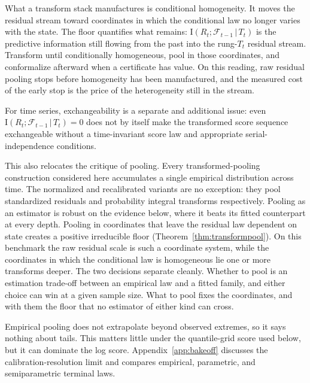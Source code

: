\documentclass[11pt]{article}
\theoremstyle{remark}
\newcommand{\I}{\mathrm{I}}
\newcommand{\given}{\,|\,}
\newcommand{\F}{\mathcal{F}}
\begin{document}
What a transform stack manufactures is conditional homogeneity. It moves the residual stream
toward coordinates in which the conditional law no longer varies with the state. The floor
quantifies what remains: $\I(R_t;\F_{t-1}\given T_t)$ is the predictive information still
flowing from the past into the rung-$T_t$ residual stream. Transform until conditionally homogeneous, pool
in those coordinates, and conformalize afterward when a certificate has value. On this
reading, raw residual pooling stops before homogeneity has been manufactured,
and the measured cost of the early stop is the price of the heterogeneity still in the stream.

For time series, exchangeability is a separate and additional issue: even
$\I(R_t;\F_{t-1}\given T_t)=0$ does not by itself make the transformed score sequence
exchangeable without a time-invariant score law and appropriate serial-independence
conditions.

This also relocates the critique of pooling. Every transformed-pooling construction considered here accumulates a single empirical
distribution across time. The normalized and recalibrated variants are no exception: they
pool standardized residuals and probability integral transforms respectively.
Pooling as an estimator is robust on the evidence below, where it beats its fitted
counterpart at every depth. Pooling in coordinates that leave the residual law dependent on state creates a positive
irreducible floor (Theorem~\ref{thm:transformpool}). On this benchmark the raw residual
scale is such a coordinate system, while the coordinates in which the conditional law is homogeneous lie one
or more transforms deeper. The two decisions separate cleanly. Whether to pool is an estimation
trade-off between an empirical law and a fitted family, and either choice can win at a given
sample size. What to pool fixes the coordinates, and with them the floor that no estimator of
either kind can cross.

Empirical pooling does not extrapolate beyond observed extremes, so it says nothing
about tails. This matters little under the quantile-grid score used below, but it can
dominate the log score. Appendix~\ref{app:bakeoff} discusses the calibration-resolution
limit and compares empirical, parametric, and semiparametric terminal laws.
\end{document}
